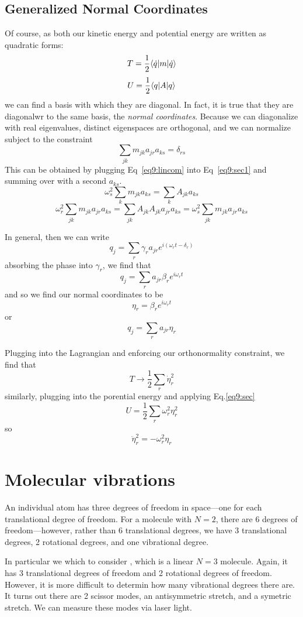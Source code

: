 \subsection{Generalized Normal Coordinates}
Of course, as both our kinetic energy and potential energy are written as quadratic forms:
\[T = \frac{1}{2}\langle\dot q\rvert m\lvert\dot q\rangle\]
\[U = \frac{1}{2}\langle q\rvert A\lvert q\rangle\]
we can find a basis with which they are diagonal. In fact, it is true that they are diagonalwr to the same basis, the \emph{normal coordinates}. Because we can diagonalize with real eigenvalues, distinct eigenspaces are orthogonal, and we can normalize subject to the constraint 
\[\sum_{jk}m_{jk}a_{jr}a_{ks} = \delta_{rs}\]
This can be obtained by plugging Eq~\ref{eq9:lincom} into Eq~\ref{eq9:sec1} and summing over with a second \(a_{ks}\).
\[\omega^2_s\sum_{k}m_{jk}a_{ks} = \sum_k A_{jk}a_{ks}\]
\begin{equation}
	\omega_r^2\sum_{jk} m_{jk}a_{jr}a_{ks} = \sum_{jk}A_{jk}A_{jk}a_{jr}a_{ks} = \omega_s^2\sum_{jk} m_{jk}a_{jr}a_{ks} \label{eq9:sec}
\end{equation}

In general, then we can write
\[q_j = \sum_r \gamma_r a_{jr}e^{i(\omega_rt-\delta_r)}\]
absorbing the phase into \(\gamma_r\), we find that 
\[q_j = \sum_ra_{jr}\beta_re^{i\omega_r t}\]
and so we find our normal coordinates to be
\begin{equation}
	\eta_r = \beta_r e^{i\omega_r t}
\end{equation}
or
\[q_j = \sum_r a_{jr}\eta_r\]

Plugging into the Lagrangian and enforcing our orthonormality constraint, we find that 
\[T\to \frac{1}{2}\sum_r\dot\eta_r^2\]
similarly, plugging into the porential energy and applying Eq.\ref{eq9:sec}
\[U = \frac{1}{2}\sum_r\omega_r^2\eta_r^2\]
so
\[\ddot\eta_r^2 = -\omega_r^2\eta_r\]

\section{Molecular vibrations}
An individual atom has three degrees of freedom in space---one for each translational degree of freedom. For a molecule with \(N=2\), there are 6 degrees of freedom---however, rather than 6 translational degrees, we have 3 translational degrees, 2 rotational degrees, and one vibrational degree. 

In particular we which to consider , which is a linear \(N=3\) molecule. Again, it has 3 translational degrees of freedom and 2 rotational degrees of freedom. However, it is more difficult to determin how many vibrational degrees there are. It turns out there are 2 scissor modes, an antisymmetric stretch, and a symetric stretch. We can measure these modes via laser light. 

